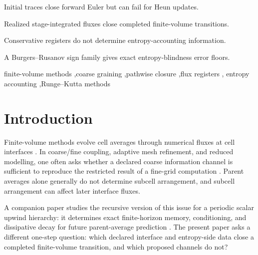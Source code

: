 \documentclass[a4paper,fleqn, sort&compress]{cas-sc}
\theoremstyle{remark}
\theoremstyle{definition}
\begin{document}

\begin{highlights}
\item Initial traces close forward Euler but can fail for Heun updates.
\item Realized stage-integrated fluxes close completed finite-volume transitions.
\item Conservative registers do not determine entropy-accounting information.
\item A Burgers--Rusanov sign family gives exact entropy-blindness error floors.
\end{highlights}

\begin{keywords}
{finite-volume methods \sep coarse graining \sep pathwise closure \sep flux registers \sep
entropy accounting \sep Runge--Kutta methods}
\end{keywords}


\maketitle



\section{Introduction}
\label{sec:introduction}

Finite-volume methods evolve cell averages through numerical fluxes at cell
interfaces \cite{LeVeque2002}.  In coarse/fine coupling, adaptive mesh
refinement, and reduced modelling, one often asks whether a declared coarse
information channel is sufficient to reproduce the restricted result of a
fine-grid computation \cite{Berger1987,BergerColella1989,
McCorquodaleColella2011,OsherSanders1983,ConstantinescuSandu2007}.  Parent
averages alone generally do not determine subcell arrangement, and subcell
arrangement can affect later interface fluxes.

A companion paper studies the recursive version of this issue for a periodic
scalar upwind hierarchy: it determines exact finite-horizon memory,
conditioning, and dissipative decay for future parent-average prediction
\cite{PolemitisChristakisDrikakis2026FVerasure}.  The present paper asks a
different one-step question: which declared interface and entropy-side data
close a completed finite-volume transition, and which proposed channels do
not?
\end{document}
